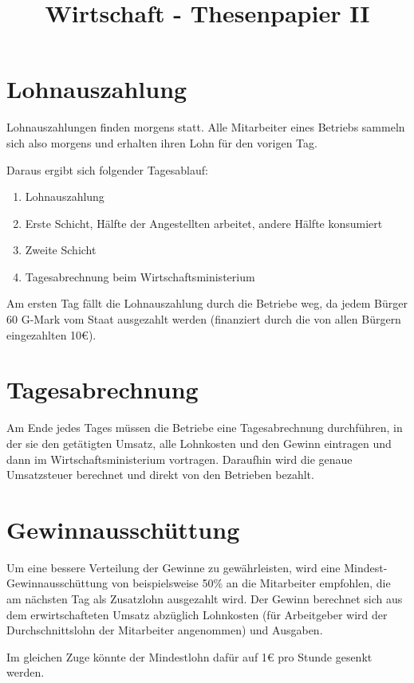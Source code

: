 \documentclass{sasbase}
\begin{document}
\onecolumn
\title{Wirtschaft - Thesenpapier II}

\mytitle

\setlength{\parindent}{0mm}
\setlength{\parskip}{2mm}

\section{Lohnauszahlung}

Lohnauszahlungen finden morgens statt. Alle Mitarbeiter eines Betriebs sammeln sich also morgens
und erhalten ihren Lohn für den vorigen Tag.

Daraus ergibt sich folgender Tagesablauf:

\begin{enumerate}
    \item Lohnauszahlung
    \item Erste Schicht, Hälfte der Angestellten arbeitet, andere Hälfte konsumiert
    \item Zweite Schicht
    \item Tagesabrechnung beim Wirtschaftsministerium
\end{enumerate}

Am ersten Tag fällt die Lohnauszahlung durch die Betriebe weg, da jedem Bürger 60 G-Mark vom Staat
ausgezahlt werden (finanziert durch die von allen Bürgern eingezahlten 10€).

\section{Tagesabrechnung}

Am Ende jedes Tages müssen die Betriebe eine Tagesabrechnung durchführen, in der sie den getätigten
Umsatz, alle Lohnkosten und den Gewinn eintragen und dann im Wirtschaftsministerium vortragen.
Daraufhin wird die genaue Umsatzsteuer berechnet und direkt von den Betrieben bezahlt.

\section{Gewinnausschüttung}

Um eine bessere Verteilung der Gewinne zu gewährleisten, wird eine Mindest-Gewinnausschüttung von
beispielsweise 50\% an die Mitarbeiter empfohlen, die am nächsten Tag als Zusatzlohn ausgezahlt
wird. Der Gewinn berechnet sich aus dem erwirtschafteten Umsatz abzüglich Lohnkosten (für
Arbeitgeber wird der Durchschnittslohn der Mitarbeiter angenommen) und Ausgaben.

Im gleichen Zuge könnte der Mindestlohn dafür auf 1€ pro Stunde gesenkt werden.
\end{document}
